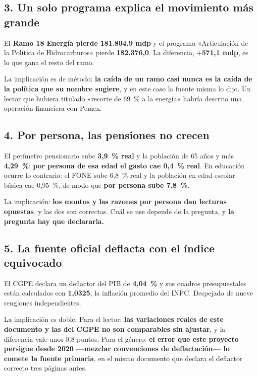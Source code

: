 \subsection*{3. Un solo programa explica el movimiento más grande}

El \textbf{Ramo 18 Energía pierde 181.804,9 mdp} y el programa «Articulación de la Política
de Hidrocarburos» pierde \textbf{182.376,0}. La diferencia, \textbf{$+$571,1 mdp}, es lo que
gana el resto del ramo.

La implicación es de método: \textbf{la caída de un ramo casi nunca es la caída de la
política que su nombre sugiere}, y en este caso la fuente misma lo dijo. Un lector que
hubiera titulado «recorte de 69~\% a la energía» habría descrito una operación financiera con
Pemex.

\subsection*{4. Por persona, las pensiones no crecen}

El perímetro pensionario sube \textbf{3,9~\% real} y la población de 65 años y más
\textbf{4,29~\%}: \textbf{por persona de esa edad el gasto cae 0,4~\% real}. En educación
ocurre lo contrario: el FONE sube 6,8~\% real y la población en edad escolar básica cae
0,95~\%, de modo que \textbf{por persona sube 7,8~\%}.

La implicación: \textbf{los montos y las razones por persona dan lecturas opuestas}, y las
dos son correctas. Cuál se use depende de la pregunta, y \textbf{la pregunta hay que
declararla.}

\subsection*{5. La fuente oficial deflacta con el índice equivocado}

El CGPE declara un deflactor del PIB de \textbf{4,04~\%} y sus cuadros presupuestales están
calculados con \textbf{1,0325}, la inflación promedio del INPC. Despejado de nueve renglones
independientes.

La implicación es doble. Para el lector: \textbf{las variaciones reales de este documento y
las del CGPE no son comparables sin ajustar}, y la diferencia vale unos 0,8 puntos. Para el
género: \textbf{el error que este proyecto persigue desde 2020 ---mezclar convenciones de
deflactación--- lo comete la fuente primaria}, en el mismo documento que declara el
deflactor correcto tres páginas antes.

